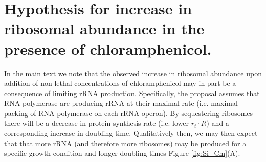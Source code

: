 \begin{figure}
    \begin{fullwidth}
\end{fullwidth}
\end{figure}



\section{Hypothesis for increase in ribosomal abundance in the presence of chloramphenicol.}

In the main text we note that the observed increase in ribosomal abundance  upon
addition of non-lethal concentrations of chloramphenicol may in part  be a
consequence of limiting rRNA production. Specifically, the proposal assumes that
RNA polymerase are producing rRNA at their maximal rate (i.e. maximal packing of
RNA polymerase on each rRNA operon). By sequestering ribosomes there will be a
decrease in protein synthesis rate (i.e. lower $r_t \cdot R$) and a
corresponding increase in doubling time. Qualitatively then, we may then expect
that that more rRNA (and therefore more ribosomes) may be produced for a
specific growth condition and longer doubling times  Figure
\ref{fig:Si_Cm}(A).

